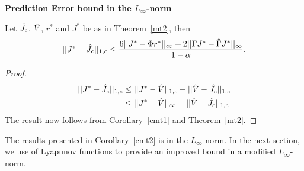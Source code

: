 \textbf{Prediction Error bound in the $L_\infty$-norm}\\
\begin{corollary}\label{cmt2}
Let $\hat{J}_c$, $\hat{V}$, $r^*$ and $J^*$ be as in Theorem~\ref{mt2}, then
\begin{align}\label{finalbnd}
||J^*-\hj||_{1,c}\leq\frac{6 ||J^*-\Phi r^*||_\infty+2||\Gamma J^*-\hg J^*||_\infty}{1-\alpha}.
\end{align}
\end{corollary}
\begin{proof}
\begin{align}
||J^*-\hj||_{1,c}&\leq||J^*-\hv||_{1,c}+||\hv-\hj||_{1,c}\nn\\\vspace{10pt}
&\leq||J^*-\hv||_\infty+||\hv-\hj||_{1,c}\nn
\end{align}
The result now follows from Corollary~\ref{cmt1} and Theorem~\ref{mt2}.
\end{proof}
The results presented in Corollary~\ref{cmt2} is in the $L_\infty$-norm. In the next section, we use of Lyapunov functions to provide an improved bound in a modified $L_\infty$-norm.

